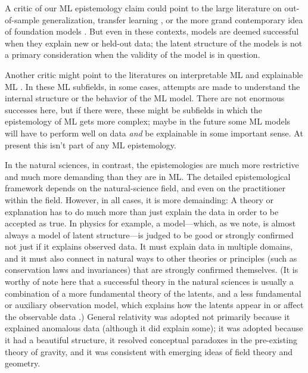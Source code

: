 \documentclass[10pt]{article}
\begin{document}
A critic of our ML epistemology claim could point to the large literature on out-of-sample generalization, transfer learning \cite{transfer}, or the more grand contemporary idea of foundation models \cite{foundation}.
But even in these contexts, models are deemed successful when they explain new or held-out data; the latent structure of the models is not a primary consideration when the validity of the model is in question.

Another critic might point to the literatures on interpretable ML \cite{interpretable} and explainable ML \cite{explainable}.
In these ML subfields, in some cases, attempts are made to understand the internal structure or the behavior of the ML model.
There are not enormous successes here, but if there were, these might be subfields in which the epistemology of ML gets more complex; maybe in the future some ML models will have to perform well on data \emph{and} be explainable in some important sense.
At present this isn't part of any ML epistemology.

In the natural sciences, in contrast, the epistemologies are much more restrictive and much more demanding than they are in ML.
The detailed epistemological framework depends on the natural-science field, and even on the practitioner within the field.
However, in all cases, it is more demainding:
A theory or explanation has to do much more than just explain the data in order to be accepted as true.
In physics for example, a model---which, as we note, is almost always a model of latent structure---is judged to be good or strongly confirmed not just if it explains observed data.
It must explain data in multiple domains, and it must also connect in natural ways to other theories or principles (such as conservation laws and invariances) that are strongly confirmed themselves.
(It is worthy of note here that a successful theory in the natural sciences is usually a combination of a more fundamental theory of the latents, and a less fundamental or auxiliary observation model, which explains how the latents appear in or affect the observable data \cite{auxiliary}.)
General relativity \cite{gr} was adopted not primarily because it explained anomalous data (although it did explain some); it was adopted because it had a beautiful structure, it resolved conceptual paradoxes in the pre-existing theory of gravity, and it was consistent with emerging ideas of field theory and geometry.
\end{document}
